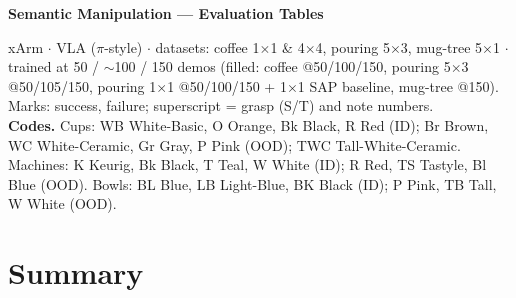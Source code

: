 \documentclass[10pt]{article}
\newcommand{\pass}{\textcolor{ok}{\ding{51}}}
\newcommand{\fail}{\textcolor{bad}{\ding{55}}}
\begin{document}
\begin{center}\Large\textbf{Semantic Manipulation --- Evaluation Tables}\end{center}
\noindent\footnotesize
xArm $\cdot$ VLA ($\pi$-style) $\cdot$ datasets: coffee 1$\times$1 \& 4$\times$4,
pouring 5$\times$3, mug-tree 5$\times$1 $\cdot$ trained at 50 / $\sim$100 / 150 demos
(filled: coffee @50/100/150, pouring 5$\times$3 @50/105/150, pouring 1$\times$1 @50/100/150 +
1$\times$1 SAP baseline, mug-tree @150). Marks: \pass{} success,
\fail{} failure; superscript = grasp (S/T) and note numbers.\\[2pt]
\textbf{Codes.} Cups: WB White-Basic, O Orange, Bk Black, R Red (ID); Br Brown,
WC White-Ceramic, Gr Gray, P Pink (OOD); TWC Tall-White-Ceramic.\;
Machines: K Keurig, Bk Black, T Teal, W White (ID); R Red, TS Tastyle, Bl Blue (OOD).\;
Bowls: BL Blue, LB Light-Blue, BK Black (ID); P Pink, TB Tall, W White (OOD).
\normalsize
\bigskip


\FloatBarrier
\section*{Summary}
\end{document}
